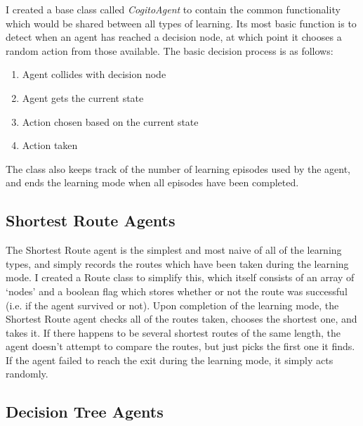 \documentclass[a4paper,oneside]{report}
\begin{document}
I created a base class called \emph{CogitoAgent} to contain the common functionality which would be shared between all types of learning. Its most basic function is to detect when an agent has reached a decision node, at which point it chooses a random action from those available. The basic decision process is as follows:

\begin{enumerate}
	\item Agent collides with decision node
	\item Agent gets the current state
	\item Action chosen based on the current state
	\item Action taken
\end{enumerate}

The class also keeps track of the number of learning episodes used by the agent, and ends the learning mode when all episodes have been completed.

\subsection{Shortest Route Agents}

The Shortest Route agent is the simplest and most naive of all of the learning types, and simply records the routes which have been taken during the learning mode. I created a Route class to simplify this, which itself consists of an array of `nodes' and a boolean flag which stores whether or not the route was successful (i.e. if the agent survived or not). Upon completion of the learning mode, the Shortest Route agent checks all of the routes taken, chooses the shortest one, and takes it. If there happens to be several shortest routes of the same length, the agent doesn't attempt to compare the routes, but just picks the first one it finds. If the agent failed to reach the exit during the learning mode, it simply acts randomly.

\subsection{Decision Tree Agents}
\end{document}

